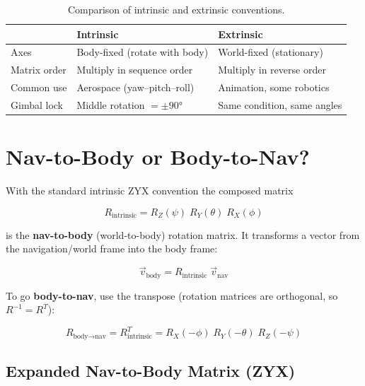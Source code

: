 \documentclass[12pt,a4paper]{article}
\begin{document}
\begin{table}[h]
\centering
\begin{tabular}{@{}lll@{}}
\toprule
 & \textbf{Intrinsic} & \textbf{Extrinsic} \\
\midrule
Axes          & Body-fixed (rotate with body)  & World-fixed (stationary) \\
Matrix order  & Multiply in sequence order     & Multiply in reverse order \\
Common use    & Aerospace (yaw--pitch--roll)   & Animation, some robotics \\
Gimbal lock   & Middle rotation $= \pm 90°$   & Same condition, same angles \\
\bottomrule
\end{tabular}
\caption{Comparison of intrinsic and extrinsic conventions.}
\end{table}

\section{Nav-to-Body or Body-to-Nav?}

With the standard intrinsic ZYX convention the composed matrix

\begin{equation}
  R_{\text{intrinsic}} = R_Z(\psi)\; R_Y(\theta)\; R_X(\phi)
\end{equation}

is the \textbf{nav-to-body} (world-to-body) rotation matrix. It transforms a
vector from the navigation/world frame into the body frame:

\begin{equation}
  \vec{v}_{\text{body}} = R_{\text{intrinsic}}\;\vec{v}_{\text{nav}}
\end{equation}

To go \textbf{body-to-nav}, use the transpose (rotation matrices are
orthogonal, so $R^{-1} = R^T$):

\begin{equation}
  R_{\text{body}\to\text{nav}} = R_{\text{intrinsic}}^T
    = R_X(-\phi)\; R_Y(-\theta)\; R_Z(-\psi)
\end{equation}

\subsection{Expanded Nav-to-Body Matrix (ZYX)}
\end{document}
